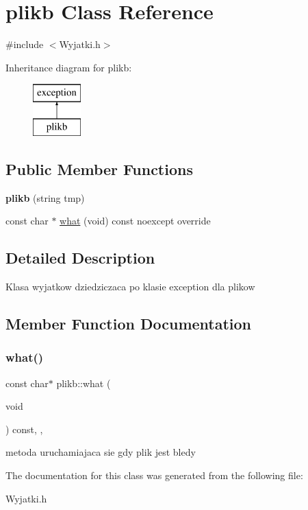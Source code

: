 \hypertarget{classplikb}{}\section{plikb Class Reference}
\label{classplikb}


{\ttfamily \#include $<$Wyjatki.\+h$>$}

Inheritance diagram for plikb\+:\begin{figure}[H]
\begin{center}
\leavevmode
\includegraphics[height=2.000000cm]{classplikb}
\end{center}
\end{figure}
\subsection*{Public Member Functions}
\begin{DoxyCompactItemize}
\item 
\mbox{\label{classplikb_a03dadb3945ee571ce073806d0f252931}} 
{\bfseries plikb} (string tmp)
\item 
const char $\ast$ \mbox{\hyperlink{classplikb_a99be76b11eb582db85d825b3bbf1da8e}{what}} (void) const noexcept override
\end{DoxyCompactItemize}


\subsection{Detailed Description}
Klasa wyjatkow dziedziczaca po klasie exception dla plikow 

\subsection{Member Function Documentation}
\mbox{\label{classplikb_a99be76b11eb582db85d825b3bbf1da8e}} 
\subsubsection{\texorpdfstring{what()}{what()}}
{\footnotesize\ttfamily const char$\ast$ plikb\+::what (\begin{DoxyParamCaption}\item[{void}]{ }\end{DoxyParamCaption}) const\hspace{0.3cm}{\ttfamily [inline]}, {\ttfamily [override]}, {\ttfamily [noexcept]}}

metoda uruchamiajaca sie gdy plik jest bledy 

The documentation for this class was generated from the following file\+:\begin{DoxyCompactItemize}
\item 
Wyjatki.\+h\end{DoxyCompactItemize}
